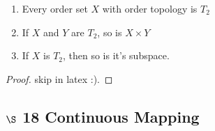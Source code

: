 \begin{thm*}$ $
	\begin{enumerate}
		\item Every order set $X$ with order topology is $T_2$
		\item If $X$ and $Y$ are $T_2$, so is $X \times Y$
		\item If $X$ is $T_2$, then so is it's subspace.
	\end{enumerate}
\end{thm*}

\begin{proof}
	skip in latex :).
\end{proof}

\newpage

\subsection*{$\S$ 18 Continuous Mapping}
















